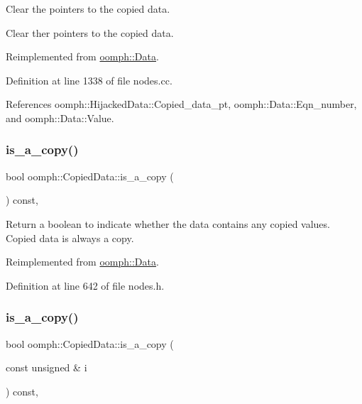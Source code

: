 Clear the pointers to the copied data. 

Clear ther pointers to the copied data. 

Reimplemented from \hyperlink{classoomph_1_1Data_a409e3140829def2b1e738a24cc1f48bb}{oomph\+::\+Data}.



Definition at line 1338 of file nodes.\+cc.



References oomph\+::\+Hijacked\+Data\+::\+Copied\+\_\+data\+\_\+pt, oomph\+::\+Data\+::\+Eqn\+\_\+number, and oomph\+::\+Data\+::\+Value.

\mbox{\label{classoomph_1_1CopiedData_ac76cb0c286daa39b501bff9ef82bb05c}} 
\subsubsection{\texorpdfstring{is\+\_\+a\+\_\+copy()}{is\_a\_copy()}\hspace{0.1cm}{\footnotesize\ttfamily [1/2]}}
{\footnotesize\ttfamily bool oomph\+::\+Copied\+Data\+::is\+\_\+a\+\_\+copy (\begin{DoxyParamCaption}{ }\end{DoxyParamCaption}) const\hspace{0.3cm}{\ttfamily [inline]}, {\ttfamily [virtual]}}



Return a boolean to indicate whether the data contains any copied values. Copied data is always a copy. 



Reimplemented from \hyperlink{classoomph_1_1Data_a736feee0f95ab3d542c70db6ca7ab233}{oomph\+::\+Data}.



Definition at line 642 of file nodes.\+h.

\mbox{\label{classoomph_1_1CopiedData_a80b677702e0cb94c5356214f5cf9f9fb}} 
\subsubsection{\texorpdfstring{is\+\_\+a\+\_\+copy()}{is\_a\_copy()}\hspace{0.1cm}{\footnotesize\ttfamily [2/2]}}
{\footnotesize\ttfamily bool oomph\+::\+Copied\+Data\+::is\+\_\+a\+\_\+copy (\begin{DoxyParamCaption}\item[{const unsigned \&}]{i }\end{DoxyParamCaption}) const\hspace{0.3cm}{\ttfamily [inline]}, {\ttfamily [virtual]}}



